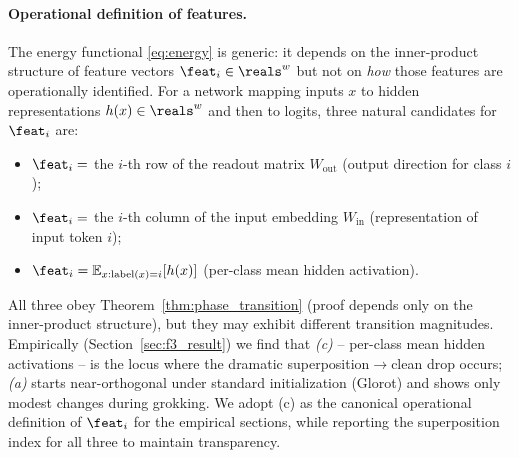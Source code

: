

\paragraph{Operational definition of features.}
The energy functional \eqref{eq:energy} is generic: it depends on the inner-product structure of feature vectors $\feat_i \in \reals^w$ but not on \emph{how} those features are operationally identified.
For a network mapping inputs $x$ to hidden representations $h(x) \in \reals^w$ and then to logits, three natural candidates for $\feat_i$ are:
\begin{itemize}
  \item[(a)] $\feat_i = $ the $i$-th row of the readout matrix $W_{\text{out}}$ (output direction for class $i$);
  \item[(b)] $\feat_i = $ the $i$-th column of the input embedding $W_{\text{in}}$ (representation of input token $i$);
  \item[(c)] $\feat_i = \mathbb{E}_{x : \text{label}(x)=i}\!\left[h(x)\right]$ (per-class mean hidden activation).
\end{itemize}
All three obey Theorem~\ref{thm:phase_transition} (proof depends only on the inner-product structure), but they may exhibit different transition magnitudes.
Empirically (Section~\ref{sec:f3_result}) we find that \emph{(c)} -- per-class mean hidden activations -- is the locus where the dramatic superposition$\to$clean drop occurs; \emph{(a)} starts near-orthogonal under standard initialization (Glorot) and shows only modest changes during grokking.
We adopt (c) as the canonical operational definition of $\feat_i$ for the empirical sections, while reporting the superposition index for all three to maintain transparency.

